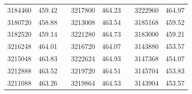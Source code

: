\documentclass[12pt]{mwart}
\begin{document}
\begin{table}[H]
\begin{tabular}{cclcclcc}
		3184460                                                  & 459.42                                                        &  & 3217800                                                  & 464.23                                                        &  & 3222960                                                  & 464.97                                                        \\
		3180720                                                  & 458.88                                                        &  & 3213008                                                  & 463.54                                                        &  & 3185168                                                  & 459.52                                                        \\
		3182520                                                  & 459.14                                                        &  & 3221280                                                  & 464.73                                                        &  & 3183000                                                  & 459.21                                                        \\
		3216248                                                  & 464.01                                                        &  & 3216720                                                  & 464.07                                                        &  & 3143880                                                  & 453.57                                                        \\
		3215048                                                  & 463.83                                                        &  & 3222624                                                  & 464.93                                                        &  & 3147368                                                  & 454.07                                                        \\
		3212888                                                  & 463.52                                                        &  & 3219720                                                  & 464.51                                                        &  & 3145704                                                  & 453.83                                                        \\
		3211088                                                  & 463.26                                                        &  & 3219864                                                  & 464.53                                                        &  & 3143904                                                  & 453.57                                                        \\

\end{tabular}
\end{table}
\end{document}
